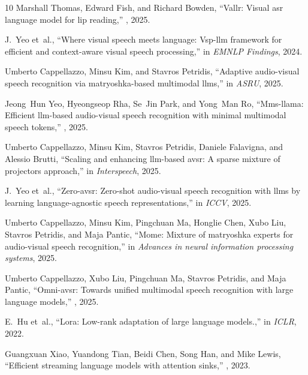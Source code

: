 \documentclass{article}
\begin{document}
\begin{thebibliography}{10}
Marshall Thomas, Edward Fish, and Richard Bowden,
\newblock ``Vallr: Visual asr language model for lip reading,''
, 2025.

J.~Yeo et~al.,
\newblock ``Where visual speech meets language: Vsp-llm framework for efficient
  and context-aware visual speech processing,''
\newblock in {\em EMNLP Findings}, 2024.

Umberto Cappellazzo, Minsu Kim, and Stavros Petridis,
\newblock ``Adaptive audio-visual speech recognition via matryoshka-based
  multimodal llms,''
\newblock in {\em ASRU}, 2025.

Jeong~Hun Yeo, Hyeongseop Rha, Se~Jin Park, and Yong~Man Ro,
\newblock ``Mms-llama: Efficient llm-based audio-visual speech recognition with
  minimal multimodal speech tokens,''
, 2025.

Umberto Cappellazzo, Minsu Kim, Stavros Petridis, Daniele Falavigna, and
  Alessio Brutti,
\newblock ``Scaling and enhancing llm-based avsr: A sparse mixture of
  projectors approach,''
\newblock in {\em Interspeech}, 2025.

J.~Yeo et~al.,
\newblock ``Zero-avsr: Zero-shot audio-visual speech recognition with llms by
  learning language-agnostic speech representations,''
\newblock in {\em ICCV}, 2025.

Umberto Cappellazzo, Minsu Kim, Pingchuan Ma, Honglie Chen, Xubo Liu, Stavros
  Petridis, and Maja Pantic,
\newblock ``Mome: Mixture of matryoshka experts for audio-visual speech
  recognition,''
\newblock in {\em Advances in neural information processing systems}, 2025.

Umberto Cappellazzo, Xubo Liu, Pingchuan Ma, Stavros Petridis, and Maja Pantic,
\newblock ``Omni-avsr: Towards unified multimodal speech recognition with large
  language models,''
, 2025.

E.~Hu et~al.,
\newblock ``Lora: Low-rank adaptation of large language models.,''
\newblock in {\em ICLR}, 2022.

Guangxuan Xiao, Yuandong Tian, Beidi Chen, Song Han, and Mike Lewis,
\newblock ``Efficient streaming language models with attention sinks,''
, 2023.


\end{thebibliography}
\end{document}
